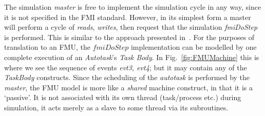 \documentclass{llncs}%
\begin{document}
The simulation \emph{master} is free to implement the simulation cycle in any way, since it is not specified in the FMI standard. However, in its simplest form a master will perform a cycle of \emph{reads}, \emph{writes}, then request that the simulation \emph{fmiDoStep} is performed. This is similar to the approach presented in~\cite{ae2012b}. For the purposes of translation to an FMU, the $fmiDoStep$ implementation can be modelled by one complete execution of an \emph{Autotask}'s \emph{Task Body}. In Fig.~\ref{fig:FMUMachine} this is where we see the sequence of events \emph{evt3, evt4}; but it may contain any of the \emph{TaskBody} constructs. Since the scheduling of the \emph{autotask} is performed by the \emph{master}, the FMU model is more like a \emph{shared} machine construct, in that it is a `passive'. It is not associated with its own thread (task/process etc.) during simulation, it acts merely as a slave to some thread via its subroutines. 
\end{document}
